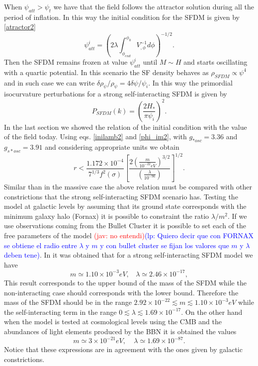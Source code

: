 \documentclass[amssymb,twocolumn,prd,nofootinbib,showpacs]{revtex4-1}
\newcommand{\jav}[1]{\textcolor{red}{(jav: #1)}}
\newcommand{\lp}[1]{\textcolor{blue}{(lp: #1)}}
\begin{document}
When $\psi_{att}>\psi_t$ we have that the field follows the attractor solution during all the period of inflation. 
In this way the initial condition for the SFDM is given by \eqref{atractor2}
%
\begin{equation}\label{atractor3}
\psi_{att}^i = \left(2\lambda\int_{\phi_{end}}^{\phi_0}V^{-1}_{,\phi}d\phi\right)^{-1/2}.
\end{equation}
%
Then the SFDM remains frozen at value $\psi_{att}^i$ until $M\sim H$ and starts oscillating with a 
quartic potential. In this scenario the SF density behaves as $\rho_{SFDM}\propto \psi^4$ and 
in such case we can write $\delta\rho_{\psi}/\rho_\psi=4\delta\psi/\psi_i$. In this way the primordial 
isocurvature perturbations for a strong self-interacting SFDM is given by
%
\begin{equation}
P_{SFDM}(k)=\left(\frac{2H_*}{\pi\psi_i}\right)^2.
\end{equation}
%
In the last section we showed the relation of the initial condition  with the value of the 
field today. Using eqs. \eqref{inilamb2} and \eqref{phi_im2}, 
with $g_{*osc}=3.36$ and $g_{s*osc}=3.91$  and considering appropriate units we obtain
%
\begin{equation}\label{constr4}
r<\frac{1.172\times 10^{-4}}{7^{1/3}f^2(\sigma)}\left[\frac{2
\left(\frac{m}{10^{-22}eV}\right)^{3/2}}{\left(\frac{\lambda}{10^{-96}}\right)}\right]^{1/2}.
\end{equation}
%
Similar than in the massive case the above relation must be compared with other constrictions that the strong self-interacting SFDM scenario has. Testing the model at galactic levels by assuming that its ground state 
corresponds with the minimum galaxy halo (Fornax) \cite{SFphi42} it is possible to constraint the ratio $\lambda/m^2$. 
If we use observations coming from the Bullet Cluster \cite{bullet} it is possible to set each of the free parameters of the model \jav{no entendi}\lp{Quiero decir que con FORNAX se obtiene el radio entre $\lambda$ y $m$ y con bullet cluster se fijan los valores que $m$ y $\lambda$ deben tene}. 
In \cite{SFphi42} it was obtained that for a strong self-interacting SFDM model we have
%
\begin{equation}
m\simeq 1.10\times10^{-3}eV, \ \ \ \ \lambda \simeq 2.46\times 10^{-17},
\end{equation}
%
This result corresponds to the upper bound of the mass of the SFDM while the non-interacting case should corresponds with the lower bound. Therefore the mass of the SFDM should be in the range $2.92\times 10^{-22}\lesssim m\lesssim 1.10\times 10^{-3}eV$ while the self-interacting term in the range $0\lesssim \lambda \lesssim 1.69\times 10^{-17}$. On the other hand when the model is tested at cosmological levels using the CMB and the 
abundances of light elements produced by the BBN it is obtained the values \cite{SFphi41,SFphi42}
%
\begin{equation}\label{masslamb}
m\simeq3\times 10^{-21}eV, \ \ \ \ \ \lambda \simeq 1.69\times 10^{-87}.
\end{equation}
%
Notice that these expressions are in agreement with the ones given by galactic constrictions.
\end{document}
